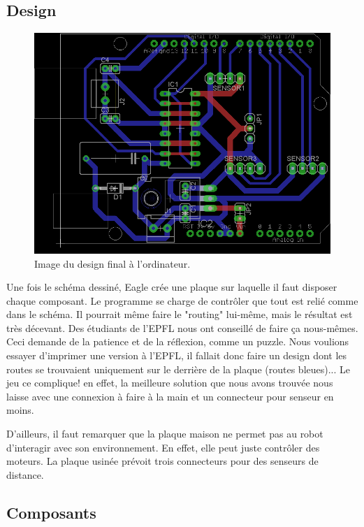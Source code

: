 \documentclass[a4paper,11pt]{report}
\begin{document}
{\subsection{Design}
\begin{figure}[h]
\centering
\includegraphics[width=1\textwidth]{figures/board_CHI.png}
\caption[Design final du PCB]{\label{BoardChine}Image du design final à l'ordinateur.
}
\end{figure}

Une fois le schéma dessiné, Eagle crée une plaque sur laquelle il faut disposer chaque composant. Le programme se charge de contrôler que tout est relié comme dans le schéma. Il pourrait même faire le "routing" lui-même, mais le résultat est très décevant. Des étudiants de l'EPFL nous ont conseillé de faire ça nous-mêmes. Ceci demande de la patience et de la réflexion, comme un puzzle. Nous voulions essayer d'imprimer une version à l'EPFL, il fallait donc faire un design dont les routes se trouvaient uniquement sur le derrière de la plaque (routes bleues)... Le jeu ce complique! en effet, la meilleure solution que nous avons trouvée nous laisse avec une connexion à faire à la main et un connecteur pour senseur en moins.

D'ailleurs, il faut remarquer que la plaque maison ne permet pas au robot d'interagir avec son environnement. En effet, elle peut juste contrôler des moteurs. La plaque usinée prévoit trois connecteurs pour des senseurs de distance.


\subsection{Composants}

}
\end{document}

